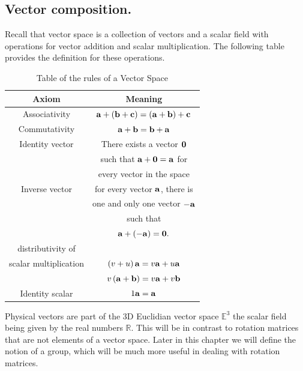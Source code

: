 \subsection{Vector composition.}
Recall that vector space is a collection of vectors and a scalar field with operations for vector addition and scalar multiplication.  The following table provides the definition for these operations.
%
%
\begin{table}[ht]
\caption{Table of the rules of a Vector Space}
\begin{tabular}{cc}
\hline 
Axiom & Meaning\\
\hline 
\hline 
Associativity & $\mathbf{a}+\left(\mathbf{b}+\mathbf{c}\right)=\left(\mathbf{a}+\mathbf{b}\right)+\mathbf{c}$\\
\hline 
Commutativity & $\mathbf{a}+\mathbf{b}=\mathbf{b}+\mathbf{a}$
\\\hline 
Identity vector & 
	There exists a vector $\mathbf{0}$ \\& 
	such that $\mathbf{a}+\mathbf{0}=\mathbf{a}$ for \\&
	every vector in the space
\\\hline 
Inverse vector & 
	for every vector $\mathbf{a}$, there is \\&
	 one and only one vector $-\mathbf{a}$\\&
	such that \\&
	$\mathbf{a}+\left(-\mathbf{a}\right)=\mathbf{0}.$
\\\hline 
distributivity of \\ scalar multiplication & 
	$\left(v+u\right)\mathbf{a}=v\mathbf{a}+u\mathbf{a}$ \\&
	$v\left(\mathbf{a}+\mathbf{b}\right)=v\mathbf{a}+v\mathbf{b}$
\\\hline 
Identity scalar & $1\mathbf{a}=\mathbf{a}$\tabularnewline
\hline 
\end{tabular}
\end{table}

Physical vectors are part of the 3D Euclidian vector space $\mathbb{E}^3$ the scalar field being given by the real numbers $\mathbb{R}$.  This will be in contrast to rotation matrices that are not elements of a vector space.  Later in this chapter we will define the notion of a group, which will be much more useful in dealing with rotation matrices.

